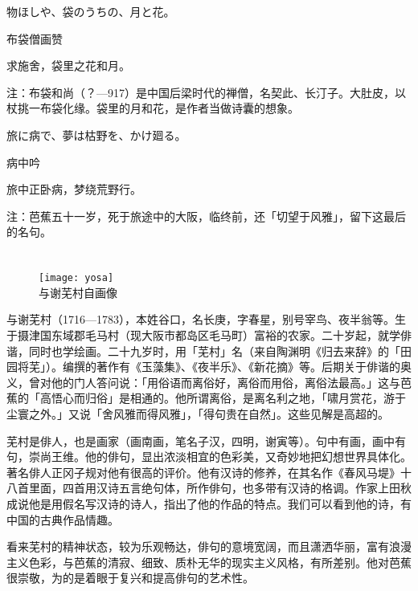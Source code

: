 \begin{haiku}
    {\FH 物ほしや、袋のうちの、月と花。}

    {\FK 布袋僧画赞}

    {\FK 求施舍，袋里之花和月。}

    {\FT 注：布袋和尚（？—917）是中国后梁时代的禅僧，名契此、长汀子。大肚皮，以杖挑一布袋化缘。袋里的月和花，是作者当做诗囊的想象。}
\end{haiku}

\begin{haiku}
    {\FH 旅に病で、夢は枯野を、かけ廻る。}

    {\FK 病中吟}

    {\FK 旅中正卧病，梦绕荒野行。}

    {\FT 注：芭蕉五十一岁，死于旅途中的大阪，临终前，还「切望于风雅」，留下这最后的名句。}
\end{haiku}

\chapter[{\FM 与謝蕪村}]{\FM {}}

\begin{center}
    \begin{figure}
        \centering
        \texttt{[image: yosa]}\\[1em]
        \large{\FS 与谢芜村自画像}
    \end{figure}
\end{center}

\newpage

{\FS
    与谢芜村（1716—1783），本姓谷口，名长庚，字春星，别号宰鸟、夜半翁等。生于摄津国东域郡毛马村（现大阪市都岛区毛马町）富裕的农家。二十岁起，就学俳谐，同时也学绘画。二十九岁时，用「芜村」名（来自陶渊明《归去来辞》的「田园将芜」）。编撰的著作有《玉藻集》、《夜半乐》、《新花摘》等。后期关于俳谐的奥义，曾对他的门人答问说：「用俗语而离俗好，离俗而用俗，离俗法最高。」这与芭蕉的「高悟心而归俗」是相通的。他所谓离俗，是离名利之地，「啸月赏花，游于尘寰之外。」又说「舍风雅而得风雅」，「得句贵在自然」。这些见解是高超的。

    芜村是俳人，也是画家（画南画，笔名子汉，四明，谢寅等）。句中有画，画中有句，崇尚王维。他的俳句，显出浓淡相宜的色彩美，又奇妙地把幻想世界具体化。著名俳人正冈子规对他有很高的评价。他有汉诗的修养，在其名作《春风马堤》\footnotemark[1]十八首里面，四首用汉诗五言绝句体，所作俳句，也多带有汉诗的格调。作家上田秋成说他是用假名写汉诗的诗人，指出了他的作品的特点。我们可以看到他的诗，有中国的古典作品情趣。

    看来芜村的精神状态，较为乐观畅达，俳句的意境宽阔，而且潇洒华丽，富有浪漫主义色彩，与芭蕉的清寂、细致、质朴无华的现实主义风格，有所差别。他对芭蕉很崇敬，为的是着眼于复兴和提高俳句的艺术性。
}


